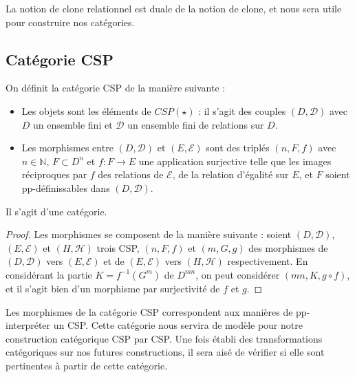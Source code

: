 La notion de clone relationnel est duale de la notion de clone, et nous sera
utile pour construire nos catégories.



\subsection{Catégorie CSP}

\begin{defi}{}\label{catCSP}
    On définit la catégorie CSP de la manière suivante :
    \begin{itemize}
        \item Les objets sont les éléments de $CSP(\star)$ : il s'agit des couples
            $(D,\mathcal{D})$ avec $D$ un ensemble fini et $\mathcal{D}$ un
            ensemble fini de relations sur $D$.
        \item Les morphismes entre  $(D,\mathcal{D})$ et  $(E,\mathcal{E})$ sont
            des triplés $(n,F,f)$ avec $n \in \mathbb{N}$, $F \subset D^n$ et $f :
            F \rightarrow E$ une application surjective telle que les images
            réciproques par $f$ des relations de $\mathcal{E}$, de la relation
            d'égalité sur $E$, et $F$ soient pp-définissables dans
            $(D,\mathcal{D})$.
    \end{itemize}
    Il s'agit d'une catégorie.
\end{defi}


\begin{proof}
    Les morphismes se composent de la manière suivante : soient $(D,\mathcal{D})$,
    $(E,\mathcal{E})$ et $(H,\mathcal{H})$ trois CSP, $(n,F,f)$ et $(m,G,g)$
    des morphismes de $(D,\mathcal{D})$ vers $(E,\mathcal{E})$ et de
    $(E,\mathcal{E})$ vers $(H,\mathcal{H})$ respectivement. En considérant la
    partie $K = f^{-1}(G^m)$ de $D^{mn}$, on peut considérer $(mn,K,g \circ
    f)$, et il s'agit bien d'un morphisme par surjectivité de $f$ et $g$.
\end{proof}

Les morphismes de la catégorie CSP correspondent aux manières de pp-interpréter
un CSP.  Cette catégorie nous servira de modèle pour notre construction
catégorique CSP par CSP. Une fois établi des transformations catégoriques sur
nos futures constructions, il sera aisé de vérifier si elle sont pertinentes à
partir de cette catégorie.

